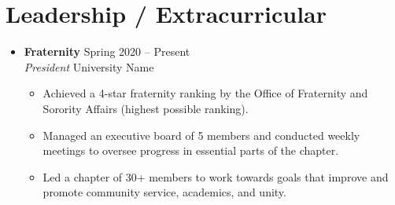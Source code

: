 \documentclass[letterpaper,5pt]{article}
\newcommand{\smalltextbullet}{\,\begin{picture}(-1,1)(-1,-3)\circle*{3}\end{picture}\ }
\begin{document}
    
    
    \section{Leadership / Extracurricular}
    \begin{itemize}[leftmargin=0in, label={}]
        \item[]
            \textbf{Fraternity} \hfill Spring 2020 -- Present \\
            \textit{President} \hfill University Name
            \begin{itemize}
                \item[\smalltextbullet] Achieved a 4-star fraternity ranking by the Office of Fraternity and Sorority Affairs (highest possible ranking).
                \item[\smalltextbullet] Managed an executive board of 5 members and conducted weekly meetings to oversee progress in essential parts of the chapter.
                \item[\smalltextbullet] Led a chapter of 30+ members to work towards goals that improve and promote community service, academics, and unity.
            \end{itemize}
    \end{itemize}
    
    
\end{document}
